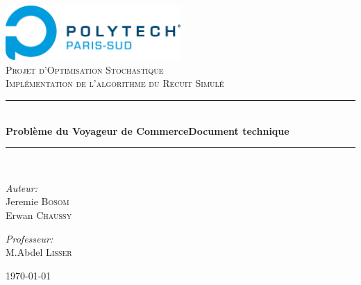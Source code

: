 \newcommand{\HRule}{\rule{\linewidth}{0.5mm}}

\begin{titlepage}
\begin{center}

\includegraphics[width=0.5\textwidth]{../polytech}~\\[1cm]

\textsc{\LARGE Projet d'Optimisation Stochastique}\\[1.5cm]

\textsc{\Large Implémentation de l'algorithme du Recuit Simulé}\\[0.5cm]

\HRule \\[0.4cm]
{ \huge \bfseries Problème du Voyageur de Commerce\newline Document technique\\[0.4cm] }
\HRule \\[1.5cm]

\begin{minipage}{0.4\textwidth}
\begin{flushleft} \large
\emph{Auteur:}\\
Jeremie \textsc{Bosom}\\
Erwan \textsc{Chaussy}
\end{flushleft}
\end{minipage}
\begin{minipage}{0.4\textwidth}
\begin{flushright} \large
\emph{Professeur:} \\
M.Abdel \textsc{Lisser}
\end{flushright}
\end{minipage}

\vfill

{\large \today}

\end{center}
\end{titlepage}
